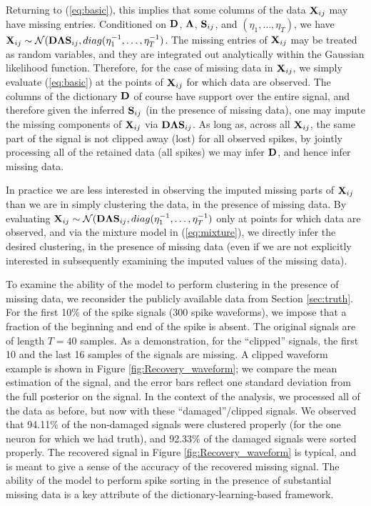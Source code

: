 \documentclass[journal]{IEEEtran}
\begin{document}
Returning to (\ref{eq:basic}), this implies that some columns of the data ${\mathbf X}_{ij}$ may have missing entries. Conditioned on ${\mathbf D}$, $\boldsymbol{\Lambda}$, ${\mathbf S}_{ij}$, and $(\eta_1,\dots,\eta_T)$, we have ${\mathbf X}_{ij}\sim\mathcal{N}({\mathbf D}\boldsymbol{\Lambda}{\mathbf S}_{ij},\relax{diag}(\eta_1^{-1},\dots,\eta_T^{-1})$. The missing entries of ${\mathbf X}_{ij}$ may be treated as random variables, and they are integrated out analytically within the Gaussian likelihood function. Therefore, for the case of missing data in ${\mathbf X}_{ij}$, we simply evaluate (\ref{eq:basic}) at the points of ${\mathbf X}_{ij}$ for which data are observed. The columns of the dictionary ${\mathbf D}$ of course have support over the entire signal, and therefore given the inferred ${\mathbf S}_{ij}$ (in the presence of missing data), one may impute the missing components of ${\mathbf X}_{ij}$ via ${\mathbf D}\boldsymbol{\Lambda}{\mathbf S}_{ij}$. As long as, across all ${\mathbf X}_{ij}$, the same part of the signal is not clipped away (lost) for all observed spikes, by jointly processing all of the {retained} data (all spikes) we may infer ${\mathbf D}$, and hence infer missing data.

In practice we are less interested in observing the imputed missing parts of ${\mathbf X}_{ij}$ than we are in simply clustering the data, in the presence of missing data. By evaluating ${\mathbf X}_{ij}\sim\mathcal{N}({\mathbf D}\boldsymbol{\Lambda}{\mathbf S}_{ij},\relax{diag}(\eta_1^{-1},\dots,\eta_T^{-1})$ only at points for which data are observed, and via the mixture model in (\ref{eq:mixture}), we directly infer the desired clustering, in the presence of missing data (even if we are not explicitly interested in subsequently examining the imputed values of the missing data).

To examine the ability of the model to perform clustering in the
presence of missing data, we reconsider the publicly available data
from Section \ref{sec:truth}. For the first 10\% of the spike
signals (300 spike waveforms), we impose that a fraction of
the beginning and end of the spike is absent. The original signals
are of length $T=40$ samples. As a demonstration, for the ``clipped'' signals, the first 10 and the last 16 samples of the
signals are missing. A clipped waveform example is shown in Figure \ref{fig:Recovery_waveform}; we compare the mean estimation of the signal, and the error bars reflect one standard deviation from the full posterior on the signal.
In the context of the analysis, we processed all of the data as before, but now with these ``damaged''/clipped signals. We observed that 94.11\% of the non-damaged signals were clustered properly (for the one neuron for which we had truth), and 92.33\% of the damaged signals were sorted properly. The recovered signal in Figure \ref{fig:Recovery_waveform} is typical, and is meant to give a sense of the accuracy of the recovered missing signal. The ability of the model to perform spike sorting in the presence of substantial missing data is a key attribute of the dictionary-learning-based framework.
\end{document}
